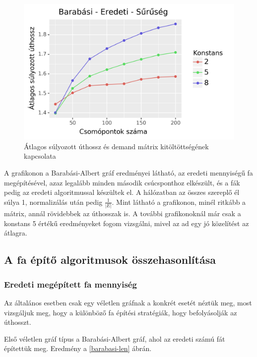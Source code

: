 \documentclass[12pt]{report}
\begin{document}
\begin{figure}[H]
	\begin{center}
		\includegraphics[width=0.9\linewidth]{pictures/density_len.png}
		\caption{Átlagos súlyozott úthossz és demand mátrix kitöltöttségének kapcsolata}
		\label{density-len}
	\end{center}
\end{figure}

A grafikonon a Barabási-Albert gráf eredményei látható, az eredeti mennyiségű fa megépítésével, azaz legalább minden második csúcsponthoz elkészült, és a fák pedig az eredeti algoritmussal készültek el.
A hálózatban az összes szereplő él súlya 1, normalizálás után pedig
\(\frac{1}{|E|}\).
Mint látható a grafikonon, minél ritkább a mátrix, annál rövidebbek az úthosszak is.
A további grafikonoknál már csak a konstans 5 értékű eredményeket fogom vizsgálni, mivel az ad egy jó közelítést az átlagra.

\subsection{A fa építő algoritmusok összehasonlítása}

\subsubsection{Eredeti megépített fa mennyiség}

Az általános esetben csak egy véletlen gráfnak a konkrét esetét néztük meg, most vizsgáljuk meg, hogy a különböző fa építési stratégiák, hogy befolyásolják az úthosszt.

Első véletlen gráf típus a Barabási-Albert gráf, ahol az eredeti számú fát építettük meg. 
Eredmény a \ref{barabasi-len} ábrán.
\end{document}
